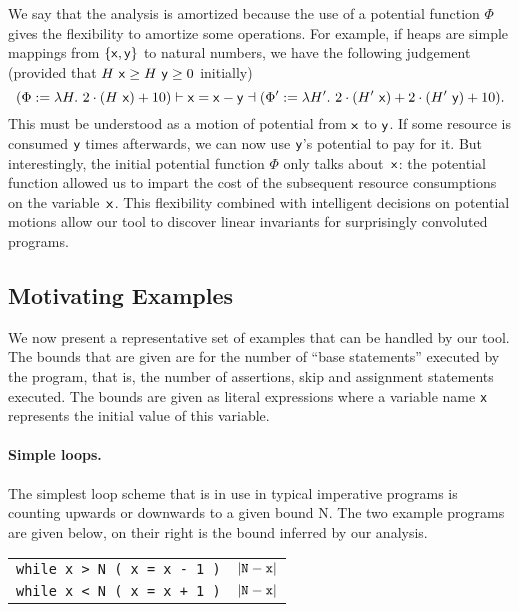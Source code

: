 \documentclass[10pt]{article}
\begin{document}
We say that the analysis is amortized because the use of a
potential function $\Phi$ gives the flexibility to amortize some
operations.  For example, if heaps are simple mappings from
$\{\mathsf{x}, \mathsf{y}\}$ to natural numbers, we have the following
judgement (provided that $H~\mathsf{x} \ge H~\mathsf{y} \ge 0$ initially)
$$
(\Phi := \lambda H.~2\cdot(H~\mathsf{x}) + 10)
\vdash \mathsf{x} = \mathsf{x} - \mathsf{y} \dashv
(\Phi' := \lambda H'.~2\cdot(H'~\mathsf{x}) + 2\cdot(H'~\mathsf{y}) + 10).
$$
This must be understood as a motion of potential from $\mathsf{x}$
to $\mathsf{y}$. If some resource is consumed $\mathsf{y}$ times afterwards, we
can now use $\mathsf{y}$'s potential to pay for it. But interestingly, the
initial potential function $\Phi$ only talks about~$\mathsf{x}$: the potential
function allowed us to impart the cost of the subsequent resource
consumptions on the variable~$\mathsf{x}$.
This flexibility combined with intelligent decisions on potential
motions allow our tool to discover linear invariants for surprisingly
convoluted programs.

\subsection{Motivating Examples}

We now present a representative set of examples that can be
handled by our tool.  The bounds that are given are for the number
of ``base statements'' executed by the program, that is, the number
of assertions, skip and assignment statements executed.  The
bounds are given as literal expressions where a variable name {\tt x}
represents the initial value of this variable.

\paragraph{Simple loops.} The simplest loop scheme that is in
use in typical imperative programs is counting upwards or
downwards to a given bound N.  The two example programs
are given below, on their right is the bound inferred by our analysis.
\begin{center}
\begin{tabular}{p{} | p{} }
\lstinline|while x > N ( x = x - 1 )| & $|{\tt N} -  {\tt x}|$ \\
\lstinline|while x < N ( x = x + 1 )| & $|{\tt N} -  {\tt x}|$ \\
\end{tabular}
\end{center}
\end{document}
